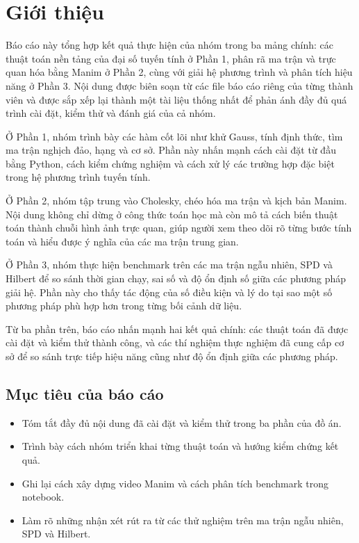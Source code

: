 \documentclass[a4paper]{article}
\begin{document}
\FloatBarrier


\section{Giới thiệu}

Báo cáo này tổng hợp kết quả thực hiện của nhóm trong ba mảng chính: các thuật toán nền tảng của đại số tuyến tính ở Phần 1, phân rã ma trận và trực quan hóa bằng Manim ở Phần 2, cùng với giải hệ phương trình và phân tích hiệu năng ở Phần 3. Nội dung được biên soạn từ các file báo cáo riêng của từng thành viên và được sắp xếp lại thành một tài liệu thống nhất để phản ánh đầy đủ quá trình cài đặt, kiểm thử và đánh giá của cả nhóm.

Ở Phần 1, nhóm trình bày các hàm cốt lõi như khử Gauss, tính định thức, tìm ma trận nghịch đảo, hạng và cơ sở. Phần này nhấn mạnh cách cài đặt từ đầu bằng Python, cách kiểm chứng nghiệm và cách xử lý các trường hợp đặc biệt trong hệ phương trình tuyến tính.

Ở Phần 2, nhóm tập trung vào Cholesky, chéo hóa ma trận và kịch bản Manim. Nội dung không chỉ dừng ở công thức toán học mà còn mô tả cách biến thuật toán thành chuỗi hình ảnh trực quan, giúp người xem theo dõi rõ từng bước tính toán và hiểu được ý nghĩa của các ma trận trung gian.

Ở Phần 3, nhóm thực hiện benchmark trên các ma trận ngẫu nhiên, SPD và Hilbert để so sánh thời gian chạy, sai số và độ ổn định số giữa các phương pháp giải hệ. Phần này cho thấy tác động của số điều kiện và lý do tại sao một số phương pháp phù hợp hơn trong từng bối cảnh dữ liệu.

Từ ba phần trên, báo cáo nhấn mạnh hai kết quả chính: các thuật toán đã được cài đặt và kiểm thử thành công, và các thí nghiệm thực nghiệm đã cung cấp cơ sở để so sánh trực tiếp hiệu năng cũng như độ ổn định giữa các phương pháp.

\subsection{Mục tiêu của báo cáo}
\begin{itemize}
    \item Tóm tắt đầy đủ nội dung đã cài đặt và kiểm thử trong ba phần của đồ án.
    \item Trình bày cách nhóm triển khai từng thuật toán và hướng kiểm chứng kết quả.
    \item Ghi lại cách xây dựng video Manim và cách phân tích benchmark trong notebook.
    \item Làm rõ những nhận xét rút ra từ các thử nghiệm trên ma trận ngẫu nhiên, SPD và Hilbert.
\end{itemize}
\end{document}
